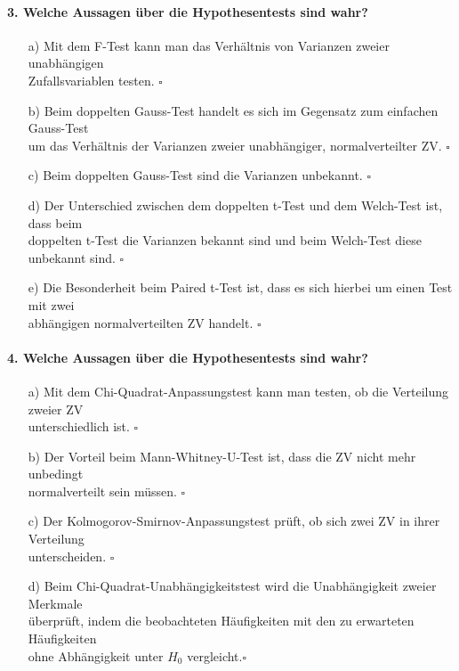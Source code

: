 \documentclass[a4paper]{article}
\begin{document}
\paragraph{3. Welche Aussagen über die Hypothesentests sind wahr? }
\begin{itemize}
    \item[a)] Mit dem F-Test kann man das Verhältnis von Varianzen zweier unabhängigen\\ Zufallsvariablen testen. \hfill $\square$
    \item[b)] Beim doppelten Gauss-Test handelt es sich im Gegensatz zum einfachen Gauss-Test\\ um das Verhältnis der Varianzen zweier unabhängiger, normalverteilter ZV. \hfill $\square$
    \item[c)] Beim doppelten Gauss-Test sind die Varianzen unbekannt. \hfill $\square$
    \item[d)] Der Unterschied zwischen dem doppelten t-Test und dem Welch-Test ist, dass beim\\ doppelten t-Test die Varianzen bekannt sind und beim Welch-Test diese unbekannt sind. \hfill $\square$
    \item[e)] Die Besonderheit beim Paired t-Test ist, dass es sich hierbei um einen Test mit zwei\\ abhängigen normalverteilten ZV handelt. \hfill $\square$
 \end{itemize}
    
\paragraph{4. Welche Aussagen über die Hypothesentests sind wahr?} \begin{itemize}
    \item[a)] Mit dem Chi-Quadrat-Anpassungstest kann man testen, ob die Verteilung zweier ZV \\unterschiedlich ist. \hfill $\square$
    \item[b)] Der Vorteil beim Mann-Whitney-U-Test ist, dass die ZV nicht mehr unbedingt\\ normalverteilt sein müssen. \hfill $\square$
    \item[c)] Der Kolmogorov-Smirnov-Anpassungstest prüft, ob sich zwei ZV in ihrer Verteilung\\ unterscheiden. \hfill $\square$
    \item[d)] Beim Chi-Quadrat-Unabhängigkeitstest wird die Unabhängigkeit zweier Merkmale\\ überprüft, indem die beobachteten Häufigkeiten mit den zu erwarteten Häufigkeiten \\ohne Abhängigkeit unter $H_0$ vergleicht.\hfill $\square$
\end{itemize}   
  
\end{document}
